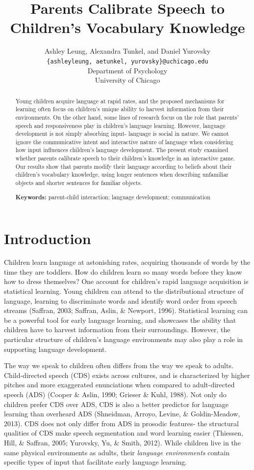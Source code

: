 \documentclass[10pt, letterpaper]{article}
\title{Parents Calibrate Speech to Children's Vocabulary Knowledge}
\author{Ashley Leung, Alexandra Tunkel, and Daniel Yurovsky \\
        \texttt{\{ashleyleung, aetunkel, yurovsky\}@uchicago.edu} \\
       Department of Psychology \\ University of Chicago}
\begin{document}
\maketitle

\begin{abstract}
Young children acquire language at rapid rates, and the proposed
mechanisms for learning often focus on children's unique ability to
harvest information from their environments. On the other hand, some
lines of research focus on the role that parents' speech and
responsiveness play in children's language learning. However, language
development is not simply absorbing input- language is social in nature.
We cannot ignore the communicative intent and interactive nature of
language when considering how input influences children's language
development. The present study examined whether parents calibrate speech
to their children's knowledge in an interactive game. Our results show
that parents modify their language according to beliefs about their
children's vocabulary knowledge, using longer sentences when describing
unfamiliar objects and shorter sentences for familiar objects.

\textbf{Keywords:}
parent-child interaction; language development; communication
\end{abstract}

\hypertarget{introduction}{%
\section{Introduction}\label{introduction}}

Children learn language at astonishing rates, acquiring thousands of
words by the time they are toddlers. How do children learn so many words
before they know how to dress themselves? One account for children's
rapid language acquisition is statistical learning. Young children can
attend to the distributional structure of language, learning to
discriminate words and identify word order from speech streams (Saffran,
2003; Saffran, Aslin, \& Newport, 1996). Statistical learning can be a
powerful tool for early language learning, and showcases the ability
that children have to harvest information from their surroundings.
However, the particular structure of children's language environments
may also play a role in supporting language development.

The way we speak to children often differs from the way we speak to
adults. Child-directed speech (CDS) exists across cultures, and is
characterized by higher pitches and more exaggerated enunciations when
compared to adult-directed speech (ADS) (Cooper \& Aslin, 1990; Grieser
\& Kuhl, 1988). Not only do children prefer CDS over ADS, CDS is also a
better predictor for language learning than overheard ADS (Shneidman,
Arroyo, Levine, \& Goldin-Meadow, 2013). CDS does not only differ from
ADS in prosodic features- the structural qualities of CDS make speech
segmentation and word learning easier (Thiessen, Hill, \& Saffran, 2005;
Yurovsky, Yu, \& Smith, 2012). While children live in the same physical
environments as adults, their \emph{language environments} contain
specific types of input that facilitate early language learning.
\end{document}
